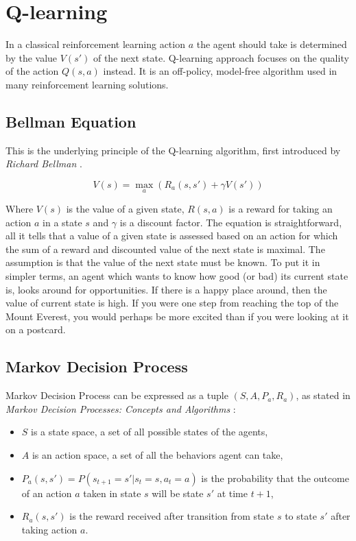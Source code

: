 \section{Q-learning}
\label{sec:q-learn}

In a classical reinforcement learning action $a$ the agent should take is determined by the value $V(s')$ of the next state. Q-learning approach focuses on the quality of the action $Q(s, a)$ instead. It is an off-policy, model-free algorithm used in many reinforcement learning solutions.

\subsection{Bellman Equation}
\label{sub:bellman-eq}

This is the underlying principle of the Q-learning algorithm, first introduced by \emph{Richard Bellman} \cite{Bellman:DynamicProgramming}.

\begin{equation}
    V(s) = \max_a\left(R_a(s, s') + \gamma V(s') \right)
\label{eq:bellman}
\end{equation}

Where $V(s)$ is the value of a given state, $R(s, a)$ is a reward for taking an action $a$ in a state $s$ and $\gamma$ is a discount factor. The equation is straightforward, all it tells that a value of a given state is assessed based on an action for which the sum of a reward and discounted value of the next state is maximal. The assumption is that the value of the next state must be known. To put it in simpler terms, an agent which wants to know how good (or bad) its current state is, looks around for opportunities. If there is a happy place around, then the value of current state is high. If you were one step from reaching the top of the Mount Everest, you would perhaps be more excited than if you were looking at it on a postcard.

\subsection{Markov Decision Process}
\label{sub:mdp}

Markov Decision Process can be expressed as a tuple $(S, A, P_a, R_a)$, as stated in \emph{Markov Decision Processes: Concepts and Algorithms} \cite{Otterlo2012MarkovDP}:

\begin{itemize}
    \item $S$ is a state space, a set of all possible states of the agents,
    \item $A$ is an action space, a set of all the behaviors agent can take,
    \item $P_a(s, s') = P(s_{t+1} = s' | s_t = s, a_t = a)$ is the probability that the outcome of an action $a$ taken in state $s$ will be state $s'$ at time $t+1$,
    \item $R_a(s, s')$ is the reward received after transition from state $s$ to state $s'$ after taking action $a$.
\end{itemize}

